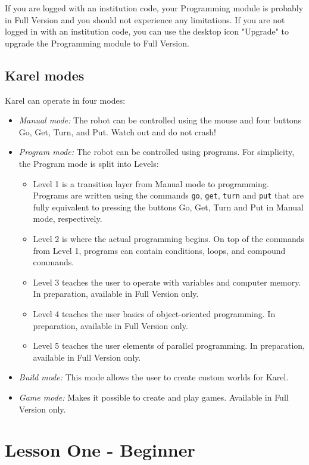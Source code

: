 \documentclass[article,A4,12pt]{llncs}
\begin{document}
If you are logged with an institution code, your Programming module is
probably in Full Version and you should not experience any limitations. If you are 
not logged in with an institution code, you can use the desktop icon "Upgrade" 
to upgrade the Programming module to Full Version.

\subsection{Karel modes}

Karel can operate in four modes:
\begin{itemize}
\item {\em Manual mode:} The robot can be controlled using the mouse and four buttons Go, Get, Turn, and Put. Watch out and do not crash!
\item {\em Program mode:} The robot can be controlled using programs. For simplicity, the Program mode is split into Levels:
\begin{itemize}
\item Level 1 is a transition layer from Manual mode to programming. Programs are written using the commands {\tt go}, {\tt get}, {\tt turn} and {\tt put} that are fully equivalent to pressing the buttons Go, Get, Turn and Put in Manual mode, respectively.
\item Level 2 is where the actual programming begins. On top of the commands from Level 1, programs can contain conditions, loops, and compound commands.
\item Level 3 teaches the user to operate with variables and computer memory. In preparation, available in Full Version only.
\item Level 4 teaches the user basics of object-oriented programming. In preparation, available in Full Version only.
\item Level 5 teaches the user elements of parallel programming. In preparation, available in Full Version only.
\end{itemize}
\item {\em Build mode:} This mode allows the user to create custom worlds for Karel.
\item {\em Game mode:} Makes it possible to create and play games. Available in Full Version only.
\end{itemize}

\section{Lesson One - Beginner}
\end{document}
